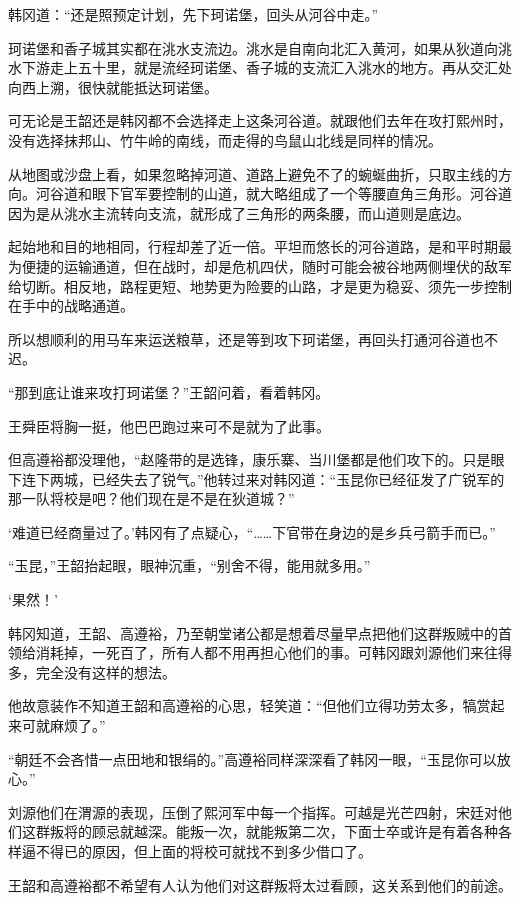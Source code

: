 韩冈道：“还是照预定计划，先下珂诺堡，回头从河谷中走。”

珂诺堡和香子城其实都在洮水支流边。洮水是自南向北汇入黄河，如果从狄道向洮水下游走上五十里，就是流经珂诺堡、香子城的支流汇入洮水的地方。再从交汇处向西上溯，很快就能抵达珂诺堡。

可无论是王韶还是韩冈都不会选择走上这条河谷道。就跟他们去年在攻打熙州时，没有选择抹邦山、竹牛岭的南线，而走得的鸟鼠山北线是同样的情况。

从地图或沙盘上看，如果忽略掉河道、道路上避免不了的蜿蜒曲折，只取主线的方向。河谷道和眼下官军要控制的山道，就大略组成了一个等腰直角三角形。河谷道因为是从洮水主流转向支流，就形成了三角形的两条腰，而山道则是底边。

起始地和目的地相同，行程却差了近一倍。平坦而悠长的河谷道路，是和平时期最为便捷的运输通道，但在战时，却是危机四伏，随时可能会被谷地两侧埋伏的敌军给切断。相反地，路程更短、地势更为险要的山路，才是更为稳妥、须先一步控制在手中的战略通道。

所以想顺利的用马车来运送粮草，还是等到攻下珂诺堡，再回头打通河谷道也不迟。

“那到底让谁来攻打珂诺堡？”王韶问着，看着韩冈。

王舜臣将胸一挺，他巴巴跑过来可不是就为了此事。

但高遵裕都没理他，“赵隆带的是选锋，康乐寨、当川堡都是他们攻下的。只是眼下连下两城，已经失去了锐气。”他转过来对韩冈道：“玉昆你已经征发了广锐军的那一队将校是吧？他们现在是不是在狄道城？”

‘难道已经商量过了。’韩冈有了点疑心，“……下官带在身边的是乡兵弓箭手而已。”

“玉昆，”王韶抬起眼，眼神沉重，“别舍不得，能用就多用。”

‘果然！’

韩冈知道，王韶、高遵裕，乃至朝堂诸公都是想着尽量早点把他们这群叛贼中的首领给消耗掉，一死百了，所有人都不用再担心他们的事。可韩冈跟刘源他们来往得多，完全没有这样的想法。

他故意装作不知道王韶和高遵裕的心思，轻笑道：“但他们立得功劳太多，犒赏起来可就麻烦了。”

“朝廷不会吝惜一点田地和银绢的。”高遵裕同样深深看了韩冈一眼，“玉昆你可以放心。”

刘源他们在渭源的表现，压倒了熙河军中每一个指挥。可越是光芒四射，宋廷对他们这群叛将的顾忌就越深。能叛一次，就能叛第二次，下面士卒或许是有着各种各样逼不得已的原因，但上面的将校可就找不到多少借口了。

王韶和高遵裕都不希望有人认为他们对这群叛将太过看顾，这关系到他们的前途。

